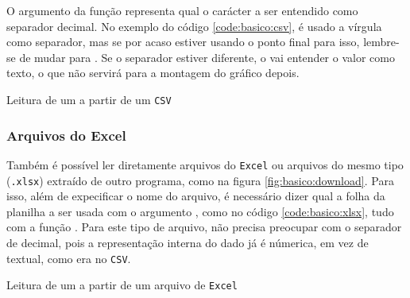     O argumento  da função representa qual o carácter a ser entendido como separador decimal. No exemplo do código \ref{code:basico:csv}, é usado a vírgula como separador, mas se por acaso estiver usando o ponto final para isso, lembre-se de mudar para . Se o separador estiver diferente, o \pandas vai entender o valor como texto, o que não servirá para a montagem do gráfico depois.

    \begin{listing}[H]
        \caption{Leitura de um \dataframe a partir de um \texttt{CSV}}
        \label{code:basico:csv}

    \end{listing}


\subsubsection{Arquivos do Excel}

    Também é possível ler diretamente arquivos do \texttt{Excel} ou arquivos do mesmo tipo (\texttt{.xlsx}) extraído de outro programa, como na figura \ref{fig:basico:download}. Para isso, além de expecificar o nome do arquivo, é necessário dizer qual a folha da planilha a ser usada com o argumento , como no código \ref{code:basico:xlsx}, tudo com a função . Para este tipo de arquivo, não precisa preocupar com o separador de decimal, pois a representação interna do dado já é númerica, em vez de textual, como era no \texttt{CSV}.

    \begin{listing}[H]
        \caption{Leitura de um \dataframe a partir de um arquivo de \texttt{Excel}}
        \label{code:basico:xlsx}

    \end{listing}

